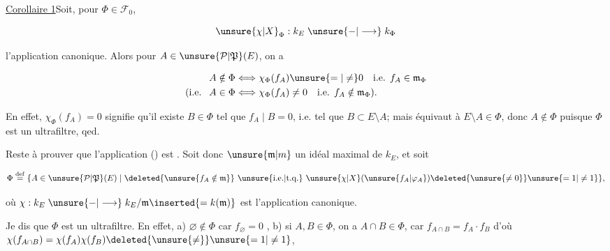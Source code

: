 \uline{Corollaire 1}\qquad Soit, pour $\Phi\in\mathscr F_0$,

\[
\unsure{\chi|X}_\Phi:k_E\mathrel{\unsure{-|\longrightarrow}}k_\Phi
\]

l'application canonique. Alors pour $A\in\unsure{\mathcal P|\mathfrak P}(E)$, on a



\[
\begin{aligned}
 A\notin\Phi&\Longleftrightarrow\chi_\Phi(f_A)\unsure{=|\ne}0\quad\text{i.e. } f_A\in\mathfrak m_\Phi\\
 \text{(i.e. }\ A\in\Phi&\Longleftrightarrow\chi_\Phi(f_A)\ne0\quad\text{i.e. } f_A\notin\mathfrak m_\Phi).
\end{aligned}
\]


En effet, $\chi_\Phi(f_A)=0$ signifie qu'il existe $B\in\Phi$ tel que $f_A\mid B=0$, i.e. tel que $B\subset E\setminus A$; mais   équivaut à $E\setminus A\in\Phi$, donc  $A\notin\Phi$ puisque $\Phi$ est un ultrafiltre, qed.



 Reste à prouver que l'application () est . Soit donc $\unsure{\mathfrak m|m}$ un idéal maximal de $k_E$, et soit

\[
\Phi\overset{\mathrm{def}}{=}\{A\in\unsure{\mathcal P|\mathfrak P}(E)\mid \deleted{\unsure{f_A\notin\mathfrak m}}\ \text{\unsure{i.e.|t.q.} }\unsure{\chi|X}(\unsure{f_A|\varphi_A})\deleted{\unsure{\ne0}}\unsure{=1|\ne1}\},
\]

où $\chi:k_E\mathrel{\unsure{-|\longrightarrow}} k_E/\mathfrak m\inserted{=k(\mathfrak m)}$ est l'application canonique.

Je dis que $\Phi$ est un ultrafiltre. En effet, a) $\varnothing\notin\Phi$ car $f_\varnothing=0$ , b) si $A,B\in\Phi$, on a  $A\cap B\in\Phi$, car $f_{A\cap B}=f_A\cdot f_B$ d'où $\chi(f_{A\cap B})=\chi(f_A)\chi(f_B)\deleted{\unsure{\ne}}\unsure{=1|\ne1}$,

